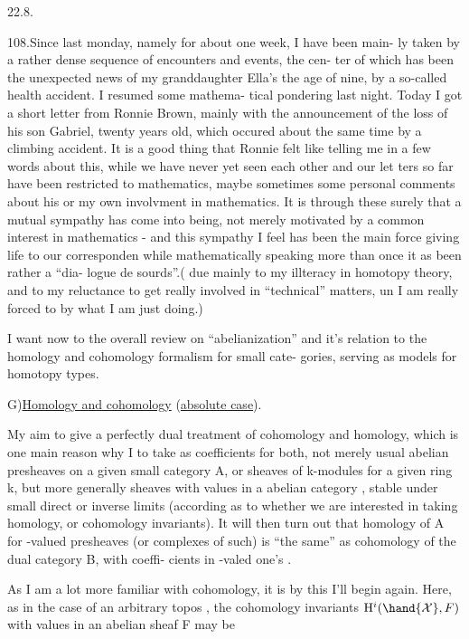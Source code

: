 
22.8.

108.\quad Since last monday,  namely for about one week,  I have been main-%
ly taken by a rather dense sequence of encounters and events,  the cen-%
ter of which has been the unexpected news of my granddaughter Ella's 
 the age of nine,  by a so-called health accident.  I resumed some mathema-%
tical pondering last night.  Today I got a short letter from Ronnie
Brown,  mainly with the announcement of the loss of his son Gabriel,
twenty years old,  which occured about the same time by a climbing
accident.  It is a good thing that Ronnie felt like telling me in a few
words about this,  while we have never yet seen each other and our let\hand{-}%
ters so far\xout{,} have been restricted to mathematics,   maybe sometimes
some personal comments about his or my own involvment in mathematics.
It is through these surely that a mutual sympathy has come into being,
not merely motivated by a common interest in mathematics  -  and this
sympathy I feel has been the main force giving life to our corresponden\hand{,}
while mathematically speaking more than once it as been rather a ``dia-%
logue de sourds''.( due mainly to my illteracy in homotopy theory,  and to
my reluctance to get really involved in  ``technical'' matters,  un I am
really forced to by what I am just doing.)
\margin{\hand{\times}}

I want now to  the overall review on ``abelianization'' and
it's relation to the homology and cohomology formalism for small cate-%
gories,  serving as models for homotopy types.

G)\quad \uline{Homology and cohomology} (\uline{absolute case}).

My aim  to give a perfectly dual treatment of cohomology and homology,
which is one main reason why I  to take as coefficients for both,
not merely usual abelian presheaves on a given small category A,  or
sheaves of k-modules for a given ring k,  but more generally sheaves
with values in a abelian category ,   stable
under small direct or inverse limits (according as to whether we are
interested in taking homology,  or cohomology invariants).  It will then
turn out that homology of A for -valued presheaves (or complexes of
such) is ``the same'' as cohomology of the dual category B, with coeffi-%
cients in  -valed  one's .

As I am a lot more familiar with cohomology,  it is by this I'll
begin again.  Here,  as in the case of an arbitrary topos ,  the
cohomology invariants  $\mathrm{H}^{i}(\hand{\mathcal{X}},F)$  with values in an abelian sheaf F may be

